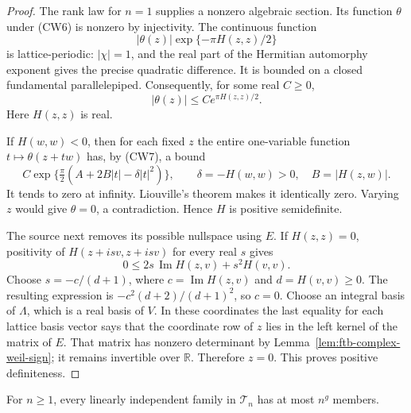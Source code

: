 \begin{proof}
The rank law for \(n=1\) supplies a nonzero algebraic section.
Its function \(\theta\) under (CW6) is nonzero by injectivity.
The continuous function
\[
           |\theta(z)|\exp\{-\pi H(z,z)/2\}
\]
is lattice-periodic: \(|\chi|=1\), and the real part of the
Hermitian automorphy exponent gives the precise quadratic
difference.  It is bounded on a closed fundamental parallelepiped.
Consequently, for some real \(C\geq0\),
\[
                  |\theta(z)|\leq C e^{\pi H(z,z)/2}.       \tag{CW7}
\]
Here \(H(z,z)\) is real.

If \(H(w,w)<0\), then for each fixed \(z\) the entire one-variable
function \(t\mapsto\theta(z+tw)\) has, by (CW7), a bound
\[
 C\exp\{\tfrac\pi2(A+2B|t|-\delta|t|^2)\},
 \qquad \delta=-H(w,w)>0,\quad B=|H(z,w)|.
\]
It tends to zero at infinity.  Liouville's theorem makes it identically
zero.  Varying \(z\) would give \(\theta=0\), a contradiction.
Hence \(H\) is positive semidefinite.

The source next removes its possible nullspace using \(E\).
If \(H(z,z)=0\), positivity of
\(H(z+isv,z+isv)\) for every real \(s\) gives
\[
                 0\leq 2s\,\operatorname{Im}H(z,v)
                                  +s^2H(v,v).
\]
Choose \(s=-c/(d+1)\), where
\(c=\operatorname{Im}H(z,v)\) and \(d=H(v,v)\geq0\).
The resulting expression is
\(-c^2(d+2)/(d+1)^2\), so \(c=0\).
Choose an integral basis of \(\Lambda\), which is a real basis of
\(V\).  In these coordinates the last equality for each lattice
basis vector says that the coordinate row of \(z\) lies in the
left kernel of the matrix of \(E\).  That matrix has nonzero
determinant by Lemma~\ref{lem:ftb-complex-weil-sign}; it remains
invertible over \(\mathbb R\).  Therefore \(z=0\).
This proves positive definiteness.
\end{proof}

\begin{srlemma}
\label{lem:ftb-complex-theta-fourier-detector}
For \(n\geq1\), every linearly independent family in
\(\mathcal T_n\) has at most \(n^g\) members.
\end{srlemma}

